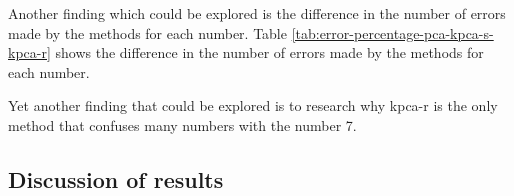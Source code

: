 Another finding which could be explored is the difference in the number of errors made by the methods for each number. Table \ref{tab:error-percentage-pca-kpca-s-kpca-r} shows the difference in the number of errors made by the methods for each number.

Yet another finding that could be explored is to research why \gls{kpca-r} is the only method that confuses many numbers with the number 7. 
\subsection{Discussion of results}


